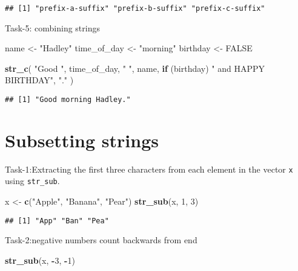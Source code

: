 \documentclass[
]{article}
\newenvironment{Shaded}{\begin{snugshade}}{\end{snugshade}}
\newcommand{\ConstantTok}[1]{\textcolor[rgb]{0.56,0.35,0.01}{#1}}
\newcommand{\ControlFlowTok}[1]{\textcolor[rgb]{0.13,0.29,0.53}{\textbf{#1}}}
\newcommand{\DecValTok}[1]{\textcolor[rgb]{0.00,0.00,0.81}{#1}}
\newcommand{\FunctionTok}[1]{\textcolor[rgb]{0.13,0.29,0.53}{\textbf{#1}}}
\newcommand{\NormalTok}[1]{#1}
\newcommand{\OtherTok}[1]{\textcolor[rgb]{0.56,0.35,0.01}{#1}}
\newcommand{\SpecialCharTok}[1]{\textcolor[rgb]{0.81,0.36,0.00}{\textbf{#1}}}
\newcommand{\StringTok}[1]{\textcolor[rgb]{0.31,0.60,0.02}{#1}}
\begin{document}
\begin{verbatim}
## [1] "prefix-a-suffix" "prefix-b-suffix" "prefix-c-suffix"
\end{verbatim}

Task-5: combining strings

\begin{Shaded}
\begin{Highlighting}[]
\NormalTok{name }\OtherTok{\textless{}{-}} \StringTok{"Hadley"}
\NormalTok{time\_of\_day }\OtherTok{\textless{}{-}} \StringTok{"morning"}
\NormalTok{birthday }\OtherTok{\textless{}{-}} \ConstantTok{FALSE}

\FunctionTok{str\_c}\NormalTok{(}
  \StringTok{"Good "}\NormalTok{, time\_of\_day, }\StringTok{" "}\NormalTok{, name,}
  \ControlFlowTok{if}\NormalTok{ (birthday) }\StringTok{" and HAPPY BIRTHDAY"}\NormalTok{,}
  \StringTok{"."}
\NormalTok{)}
\end{Highlighting}
\end{Shaded}

\begin{verbatim}
## [1] "Good morning Hadley."
\end{verbatim}

\hypertarget{subsetting-strings}{%
\section{Subsetting strings}\label{subsetting-strings}}

Task-1:Extracting the first three characters from each element in the
vector \texttt{x} using \texttt{str\_sub}.

\begin{Shaded}
\begin{Highlighting}[]
\NormalTok{x }\OtherTok{\textless{}{-}} \FunctionTok{c}\NormalTok{(}\StringTok{"Apple"}\NormalTok{, }\StringTok{"Banana"}\NormalTok{, }\StringTok{"Pear"}\NormalTok{)}
\FunctionTok{str\_sub}\NormalTok{(x, }\DecValTok{1}\NormalTok{, }\DecValTok{3}\NormalTok{)}
\end{Highlighting}
\end{Shaded}

\begin{verbatim}
## [1] "App" "Ban" "Pea"
\end{verbatim}

Task-2:negative numbers count backwards from end

\begin{Shaded}
\begin{Highlighting}[]
\FunctionTok{str\_sub}\NormalTok{(x, }\SpecialCharTok{{-}}\DecValTok{3}\NormalTok{, }\SpecialCharTok{{-}}\DecValTok{1}\NormalTok{)}
\end{Highlighting}
\end{Shaded}
\end{document}
